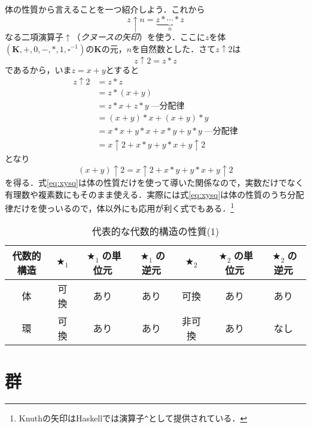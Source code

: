 \documentclass[twocolumn]{jsbook}
\newcommand{\programminglanguage}[1]{\textsf{#1}}
\newcommand{\haskell}{\programminglanguage{Haskell}}
\newcommand{\code}[1]{\texttt{#1}}
\newcommand{\keyword}[1]{{\emph{#1}}}
\DeclareMathOperator{\mathAnyBinaryOperator}{\bigstar}
\newcommand{\mathSomething}{\square}
\newcommand{\mathSet}[1]{\mathbf{#1}} %
\newcommand{\mathField}[7]{(#1,#2,#3,#4,#5,#6,#7)}
\begin{document}
体の性質から言えることを一つ紹介しよう．これから
\begin{equation}
z\uparrow n=\underbrace{z*\dotsb*z}_n
\end{equation}
なる二項演算子$\uparrow$（\keyword{クヌースの矢印}）を使う．ここに$z$を体$\mathField{\mathSet{K}}{+}{0}{-}{*}{1}{\mathSomething^{-1}}$の$\mathSet{K}$の元，$n$を自然数とした．さて$z\uparrow2$は
\begin{equation}
z\uparrow2=z*z
\end{equation}
であるから，いま$z=x+y$とすると
\begin{align}
z\uparrow2&=z*z\\
&=z*(x+y)\\
&=z*x+z*y\;\text{---分配律}\\
&=(x+y)*x+(x+y)*y\\
&=x*x+y*x+x*y+y*y\;\text{---分配律}\\
&=x\uparrow2+x*y+y*x+y\uparrow2
\end{align}
となり
\begin{equation}
\label{eq:xysq}
(x+y)\uparrow2=x\uparrow2+x*y+y*x+y\uparrow2
\end{equation}
を得る．式\eqref{eq:xysq}は体の性質だけを使って導いた関係なので，実数だけでなく有理数や複素数にもそのまま使える．実際には式\eqref{eq:xysq}は体の性質のうち分配律だけを使っいるので，体以外にも応用が利く式でもある．\footnote{Knuthの矢印は\haskell では演算子\code{\^}として提供されている．}

\begin{table*}
\caption{代表的な代数的構造の性質(1)}
\label{tab:field-and-ring}
\begin{center}
\begin{tabular}{||c||c|c|c|c|c|c||}
\hline
代数的構造&$\mathAnyBinaryOperator_1$&$\mathAnyBinaryOperator_1$の単位元&$\mathAnyBinaryOperator_1$の逆元&$\mathAnyBinaryOperator_2$&$\mathAnyBinaryOperator_2$の単位元&$\mathAnyBinaryOperator_2$の逆元\\
\hline\hline
体&可換&あり&あり&可換&あり&あり\\
環&可換&あり&あり&非可換&あり&なし\\
\hline
\end{tabular}
\end{center}
\end{table*}

\section{群}
\end{document}
